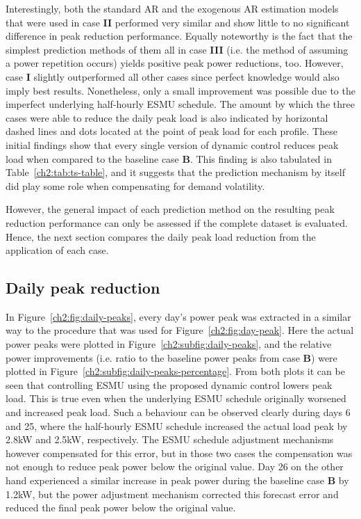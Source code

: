 Interestingly, both the standard AR and the exogenous AR estimation models that were used in case \textbf{II} performed very similar and show little to no significant difference in peak reduction performance.
Equally noteworthy is the fact that the simplest prediction methods of them all in case \textbf{III} (i.e. the method of assuming a power repetition occurs) yields positive peak power reductions, too.
However, case \textbf{I} slightly outperformed all other cases since perfect knowledge would also imply best results.
Nonetheless, only a small improvement was possible due to the imperfect underlying half-hourly ESMU schedule.
The amount by which the three cases were able to reduce the daily peak load is also indicated by horizontal dashed lines and dots located at the point of peak load for each profile.
These initial findings show that every single version of dynamic control reduces peak load when compared to the baseline case \textbf{B}.
This finding is also tabulated in Table~\ref{ch2:tab:ts-table}, and it suggests that the prediction mechanism by itself did play some role when compensating for demand volatility.



However, the general impact of each prediction method on the resulting peak reduction performance can only be assessed if the complete dataset is evaluated.
Hence, the next section compares the daily peak load reduction from the application of each case.

\subsection{Daily peak reduction}



In Figure~\ref{ch2:fig:daily-peaks}, every day's power peak was extracted in a similar way to the procedure that was used for Figure~\ref{ch2:fig:day-peak}.
Here the actual power peaks were plotted in Figure~\ref{ch2:subfig:daily-peaks}, and the relative power improvements (i.e. ratio to the baseline power peaks from case \textbf{B}) were plotted in Figure~\ref{ch2:subfig:daily-peaks-percentage}.
From both plots it can be seen that controlling ESMU using the proposed dynamic control lowers peak load.
This is true even when the underlying ESMU schedule originally worsened and increased peak load.
Such a behaviour can be observed clearly during  days 6 and 25, where the half-hourly ESMU schedule increased the actual load peak by 2.8kW and 2.5kW, respectively.
The ESMU schedule adjustment mechanisms however compensated for this error, but in those two cases the compensation was not enough to reduce peak power below the original value.
Day 26 on the other hand experienced a similar increase in peak power during the baseline case \textbf{B}\hlrem{)} by 1.2kW, but the power adjustment mechanism corrected this forecast error and reduced the final peak power below the original value.

